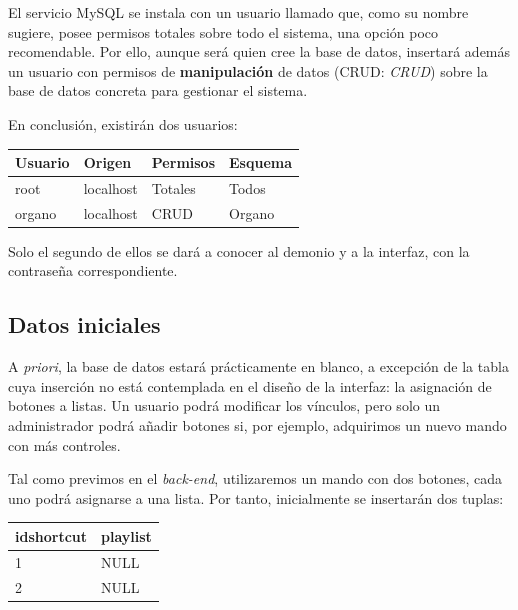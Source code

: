 El servicio MySQL se instala con un usuario llamado \textbf{} que, como su nombre sugiere, posee permisos totales sobre todo el sistema, una opción poco recomendable. Por ello, aunque será  quien cree la base de datos, insertará además un usuario con permisos de \textbf{manipulación} de datos (\acrshort{CRUD}: \textit{\acrlong{CRUD}}) sobre la base de datos concreta para gestionar el sistema.

En conclusión, existirán dos usuarios:

\smallskip

\begin{center}
	\begin{tabular}{|l|l|l|l|}
		\hline \textbf{Usuario} & \textbf{Origen} & \textbf{Permisos} & \textbf{Esquema} \\ 
		\hline root & localhost & Totales & Todos \\
		\hline organo & localhost & \acrshort{CRUD} & Organo \\ 
		\hline 
	\end{tabular}
	\smallskip
\end{center}

\smallskip

Solo el segundo de ellos se dará a conocer al demonio y a la interfaz, con la contraseña correspondiente.

\subsection{Datos iniciales}

A \textit{priori}, la base de datos estará prácticamente en blanco, a excepción de la tabla cuya inserción no está contemplada en el diseño de la interfaz: la asignación de botones a listas. Un usuario podrá modificar los vínculos, pero solo un administrador podrá añadir botones si, por ejemplo, adquirimos un nuevo mando con más controles.

Tal como previmos en el \textit{back-end}, utilizaremos un mando con dos botones, cada uno podrá asignarse a una lista. Por tanto, inicialmente se insertarán dos tuplas:

\smallskip

\begin{center}
	\begin{tabular}{|l|l|}
		\hline \textbf{idshortcut} & \textbf{playlist} \\ 
		\hline 1 & NULL \\
		\hline 2 & NULL \\ 
		\hline 
	\end{tabular}
	\smallskip
\end{center}

